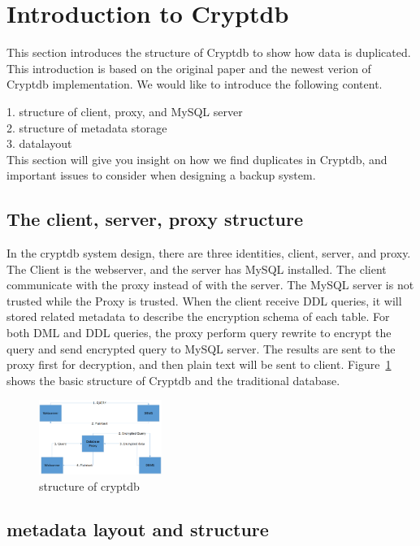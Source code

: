 \section{Introduction to Cryptdb}

This section introduces the structure of Cryptdb to show how data is duplicated. This introduction is based on the original paper and the newest verion of Cryptdb implementation. We would like to introduce the following content.

1. structure of client, proxy, and MySQL server\\
2. structure of metadata storage\\
3. datalayout \\

This section will give you insight on how we find duplicates in Cryptdb, and important issues to consider when designing a backup system.

\subsection{The client, server, proxy structure}

In the cryptdb system design, there are three identities, client, server, and proxy. The Client is the webserver, and the server has MySQL installed. The client communicate with the proxy instead of with the server. The MySQL server is not trusted while the Proxy is trusted. When the client receive DDL queries, it will stored related metadata to describe the encryption schema of each table. For both DML and DDL queries, the proxy perform query rewrite to encrypt the query and send encrypted query to MySQL server. The results are sent to the proxy first for decryption, and then plain text will be sent to client. Figure~\ref{fig:stack1} shows the basic structure of Cryptdb and the traditional database. 


\begin{figure}[tb]
\centering
\includegraphics[width=4cm]{images/Cryptdb.png}
\caption{structure of cryptdb}
\label{fig:stack1}
\end{figure}



\subsection{metadata layout and structure}

